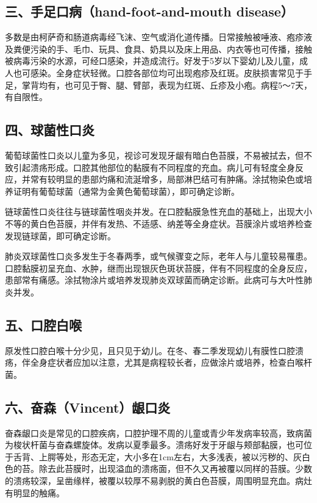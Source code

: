 \subsection{三、手足口病（hand-foot-and-mouth disease）}

多数是由柯萨奇和肠道病毒经飞沫、空气或消化道传播。日常接触被唾液、疱疹液及粪便污染的手、毛巾、玩具、食具、奶具以及床上用品、内衣等也可传播，接触被病毒污染的水源，可经口感染，并造成流行。好发于5岁以下婴幼儿及儿童，成人也可感染。全身症状轻微。口腔各部位均可出现疱疹及红斑。皮肤损害常见于手足，掌背均有，也可见于臀、腿、臂部，表现为红斑、丘疹及小疱。病程5～7天，有自限性。

\subsection{四、球菌性口炎}

葡萄球菌性口炎以儿童为多见，视诊可发现牙龈有暗白色苔膜，不易被拭去，但不致引起溃疡形成。口腔其他部位的黏膜有不同程度的充血。病儿可有轻度全身反应，并常有较明显的患部灼痛和流涎增多，局部淋巴结可有肿痛。涂拭物染色或培养证明有葡萄球菌（通常为金黄色葡萄球菌），即可确定诊断。

链球菌性口炎往往与链球菌性咽炎并发。在口腔黏膜急性充血的基础上，出现大小不等的黄白色苔膜，并伴有发热、不适感、纳差等全身症状。苔膜涂片或培养检查发现链球菌，即可确定诊断。

肺炎双球菌性口炎多发生于冬春两季，或气候骤变之际，老年人与儿童较易罹患。口腔黏膜初呈充血、水肿，继而出现银灰色斑状苔膜，伴有不同程度的全身反应，患部常有痛感。涂拭物涂片或培养发现肺炎双球菌而确定诊断。此病可与大叶性肺炎并发。

\subsection{五、口腔白喉}

原发性口腔白喉十分少见，且只见于幼儿。在冬、春二季发现幼儿有膜性口腔溃疡，伴全身症状者应加以注意，尤其是病程较长者，应做涂片或培养，检查白喉杆菌。

\subsection{六、奋森（Vincent）龈口炎}

奋森龈口炎是常见的口腔疾病，口腔护理不周的儿童或青少年发病率较高，致病菌为梭状杆菌与奋森螺旋体。发病以夏季最多。溃疡好发于牙龈与颊部黏膜，也可位于舌背、上腭等处，形态无定，大小多在1cm左右，大多浅表，被以污秽的、灰白色的苔。除去此苔膜时，出现溢血的溃疡面，但不久又再被覆以同样的苔膜。少数的溃疡较深，呈凿缘样，被覆以较厚不易剥脱的黄白色苔膜，周围明显充血。病灶有明显的触痛。

